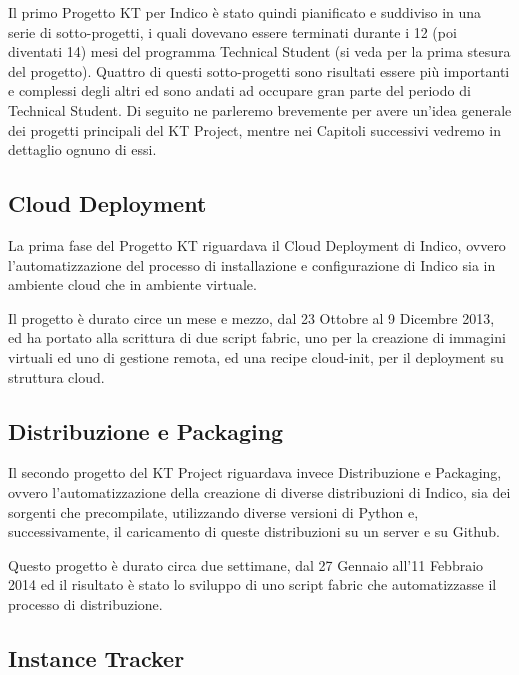     	Il primo Progetto KT per Indico è stato quindi pianificato e suddiviso in una serie di sotto-progetti, i quali dovevano essere terminati durante i 12 (poi diventati 14) mesi del programma Technical Student (si veda \cite{pedro:gist} per la prima stesura del progetto). Quattro di questi sotto-progetti sono risultati essere più importanti e complessi degli altri ed sono andati ad occupare gran parte del periodo di Technical Student. Di seguito ne parleremo brevemente per avere un'idea generale dei progetti principali del KT Project, mentre nei Capitoli successivi vedremo in dettaglio ognuno di essi.
    	
    	\subsection{Cloud Deployment} \label{subsec:p;pp;cloud}
    	
        	La prima fase del Progetto KT riguardava il Cloud Deployment di Indico, ovvero l'automatizzazione del processo di installazione e configurazione di Indico sia in ambiente cloud che in ambiente virtuale.
        	
        	Il progetto è durato circe un mese e mezzo, dal 23 Ottobre al 9 Dicembre 2013, ed ha portato alla scrittura di due script fabric, uno per la creazione di immagini virtuali ed uno di gestione remota, ed una recipe cloud-init, per il deployment su struttura cloud.
    	
    	\subsection{Distribuzione e Packaging} \label{subsec:p;pp:distribuzione}
    	
        	Il secondo progetto del KT Project riguardava invece Distribuzione e Packaging, ovvero l'automatizzazione della creazione di diverse distribuzioni di Indico, sia dei sorgenti che precompilate, utilizzando diverse versioni di Python e, successivamente, il caricamento di queste distribuzioni su un server e su Github.
        	
        	Questo progetto è durato circa due settimane, dal 27 Gennaio all'11 Febbraio 2014 ed il risultato è stato lo sviluppo di uno script fabric che automatizzasse il processo di distribuzione.
    	
    	\subsection{Instance Tracker} \label{subsec:p;pp;instance_tracker}
    	

